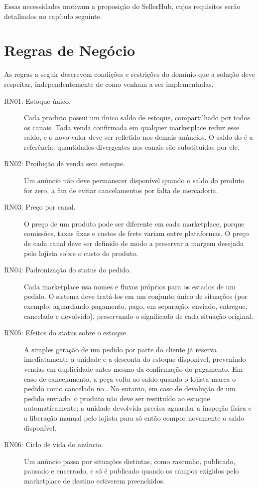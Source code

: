 Essas necessidades motivam a proposição do SellerHub, cujos requisitos serão detalhados no capítulo seguinte.

\section{Regras de Negócio}
\label{sec:regras-negocio}

As regras a seguir descrevem condições e restrições do domínio que a solução deve respeitar, independentemente de como venham a ser implementadas.

\begin{description}
\item[RN01: Estoque único.] Cada produto possui um único saldo de estoque, compartilhado por todos os canais. Toda venda confirmada em qualquer marketplace reduz esse saldo, e o novo valor deve ser refletido nos demais anúncios. O saldo do \sistema{} é a referência: quantidades divergentes nos canais são substituídas por ele.
\item[RN02: Proibição de venda sem estoque.] Um anúncio não deve permanecer disponível quando o saldo do produto for zero, a fim de evitar cancelamentos por falta de mercadoria.
\item[RN03: Preço por canal.] O preço de um produto pode ser diferente em cada marketplace, porque comissões, taxas fixas e custos de frete variam entre plataformas. O preço de cada canal deve ser definido de modo a preservar a margem desejada pelo lojista sobre o custo do produto.
\item[RN04: Padronização do status do pedido.] Cada marketplace usa nomes e fluxos próprios para os estados de um pedido. O sistema deve tratá-los em um conjunto único de situações (por exemplo: aguardando pagamento, pago, em separação, enviado, entregue, cancelado e devolvido), preservando o significado de cada situação original.
\item[RN05: Efeitos do status sobre o estoque.] A simples geração de um pedido por parte do cliente já reserva imediatamente a unidade e a desconta do estoque disponível, prevenindo vendas em duplicidade antes mesmo da confirmação do pagamento. Em caso de cancelamento, a peça volta ao saldo quando o lojista marca o pedido como cancelado no \sistema{}. No entanto, em caso de devolução de um pedido enviado, o produto não deve ser restituído ao estoque automaticamente; a unidade devolvida precisa aguardar a inspeção física e a liberação manual pelo lojista para só então compor novamente o saldo disponível.
\item[RN06: Ciclo de vida do anúncio.] Um anúncio passa por situações distintas, como rascunho, publicado, pausado e encerrado, e só é publicado quando os campos exigidos pelo marketplace de destino estiverem preenchidos.

\end{description}
